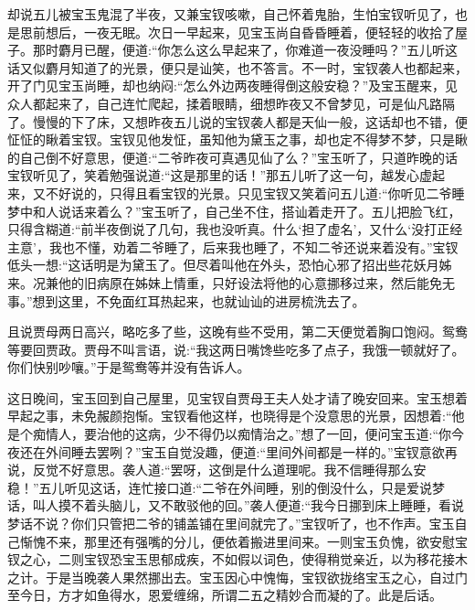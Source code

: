 \begin{parag}
    却说五儿被宝玉鬼混了半夜，又兼宝钗咳嗽，自己怀着鬼胎，生怕宝钗听见了，也是思前想后，一夜无眠。次日一早起来，见宝玉尚自昏昏睡着，便轻轻的收拾了屋子。那时麝月已醒，便道:“你怎么这么早起来了，你难道一夜没睡吗？”五儿听这话又似麝月知道了的光景，便只是讪笑，也不答言。不一时，宝钗袭人也都起来，开了门见宝玉尚睡，却也纳闷:“怎么外边两夜睡得倒这般安稳？”及宝玉醒来，见众人都起来了，自己连忙爬起，揉着眼睛，细想昨夜又不曾梦见，可是仙凡路隔了。慢慢的下了床，又想昨夜五儿说的宝钗袭人都是天仙一般，这话却也不错，便怔怔的瞅着宝钗。宝钗见他发怔，虽知他为黛玉之事，却也定不得梦不梦，只是瞅的自己倒不好意思，便道:“二爷昨夜可真遇见仙了么？”宝玉听了，只道昨晚的话宝钗听见了，笑着勉强说道:“这是那里的话！”那五儿听了这一句，越发心虚起来，又不好说的，只得且看宝钗的光景。只见宝钗又笑着问五儿道:“你听见二爷睡梦中和人说话来着么？”宝玉听了，自己坐不住，搭讪着走开了。五儿把脸飞红，只得含糊道:“前半夜倒说了几句，我也没听真。什么‘担了虚名’，又什么‘没打正经主意’，我也不懂，劝着二爷睡了，后来我也睡了，不知二爷还说来着没有。”宝钗低头一想:“这话明是为黛玉了。但尽着叫他在外头，恐怕心邪了招出些花妖月姊来。况兼他的旧病原在姊妹上情重，只好设法将他的心意挪移过来，然后能免无事。”想到这里，不免面红耳热起来，也就讪讪的进房梳洗去了。
\end{parag}


\begin{parag}
    且说贾母两日高兴，略吃多了些，这晚有些不受用，第二天便觉着胸口饱闷。鸳鸯等要回贾政。贾母不叫言语，说:“我这两日嘴馋些吃多了点子，我饿一顿就好了。你们快别吵嚷。”于是鸳鸯等并没有告诉人。
\end{parag}


\begin{parag}
    这日晚间，宝玉回到自己屋里，见宝钗自贾母王夫人处才请了晚安回来。宝玉想着早起之事，未免赧颜抱惭。宝钗看他这样，也晓得是个没意思的光景，因想着:“他是个痴情人，要治他的这病，少不得仍以痴情治之。”想了一回，便问宝玉道:“你今夜还在外间睡去罢咧？”宝玉自觉没趣，便道:“里间外间都是一样的。”宝钗意欲再说，反觉不好意思。袭人道:“罢呀，这倒是什么道理呢。我不信睡得那么安稳！”五儿听见这话，连忙接口道:“二爷在外间睡，别的倒没什么，只是爱说梦话，叫人摸不着头脑儿，又不敢驳他的回。”袭人便道:“我今日挪到床上睡睡，看说梦话不说？你们只管把二爷的铺盖铺在里间就完了。”宝钗听了，也不作声。宝玉自己惭愧不来，那里还有强嘴的分儿，便依着搬进里间来。一则宝玉负愧，欲安慰宝钗之心，二则宝钗恐宝玉思郁成疾，不如假以词色，使得稍觉亲近，以为移花接木之计。于是当晚袭人果然挪出去。宝玉因心中愧悔，宝钗欲拢络宝玉之心，自过门至今日，方才如鱼得水，恩爱缠绵，所谓二五之精妙合而凝的了。此是后话。
\end{parag}


